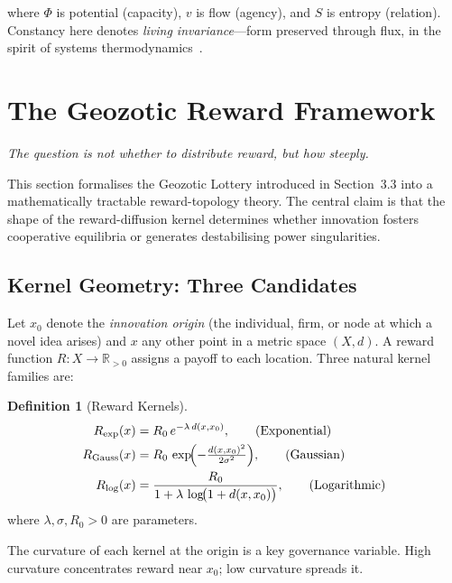 \documentclass[12pt,a4paper]{article}
\theoremstyle{definition}
\newtheorem{definition}{Definition}[section]
\begin{document}
where $\Phi$ is potential (capacity), $v$ is flow (agency), and $S$ is entropy
(relation).  Constancy here denotes \emph{living invariance}---form preserved
through flux, in the spirit of systems thermodynamics~\citep{dalziel2022}.

\section{The Geozotic Reward Framework}
\label{sec:geozotic}

\epigraph{\itshape The question is not whether to distribute reward, but
  \emph{how steeply}.}{}

This section formalises the Geozotic Lottery introduced in Section~3.3 into a
mathematically tractable reward-topology theory.  The central claim is that the
shape of the reward-diffusion kernel determines whether innovation fosters
cooperative equilibria or generates destabilising power singularities.

\subsection{Kernel Geometry: Three Candidates}

Let $x_0$ denote the \emph{innovation origin} (the individual, firm, or node at
which a novel idea arises) and $x$ any other point in a metric space
$(X, d)$.  A reward function $R : X \to \mathbb{R}_{>0}$ assigns a payoff to
each location.  Three natural kernel families are:

\begin{definition}[Reward Kernels]
  \label{def:kernels}
  \begin{align}
    R_{\exp}(x)  &= R_0\,e^{-\lambda\,d(x,x_0)},
      \tag{Exponential} \label{eq:Rexp}\\
    R_{\mathrm{Gauss}}(x) &= R_0\,\exp\!\Bigl(-\tfrac{d(x,x_0)^2}{2\sigma^2}\Bigr),
      \tag{Gaussian} \label{eq:RGauss}\\
    R_{\log}(x)  &= \frac{R_0}{1 + \lambda\,\log\!\bigl(1+d(x,x_0)\bigr)},
      \tag{Logarithmic} \label{eq:Rlog}
  \end{align}
  where $\lambda, \sigma, R_0 > 0$ are parameters.
\end{definition}

\medskip
\noindent The curvature of each kernel at the origin is a key governance
variable.  High curvature concentrates reward near $x_0$; low curvature
spreads it.
\end{document}
